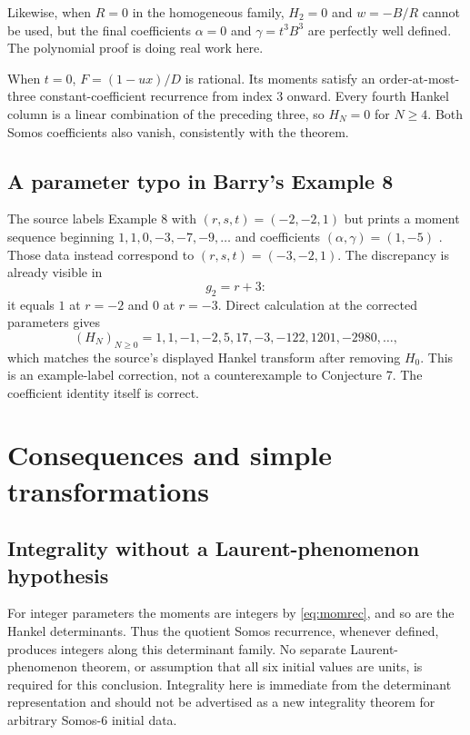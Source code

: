 \documentclass[11pt,a4paper]{article}
\numberwithin{equation}{section}
\theoremstyle{definition}
\begin{document}
Likewise, when $R=0$ in the homogeneous family, $H_2=0$ and $w=-B/R$ cannot
be used, but the final coefficients $\alpha=0$ and $\gamma=t^3B^3$ are
perfectly well defined. The polynomial proof is doing real work here.

When $t=0$, $F=(1-ux)/D$ is rational. Its moments satisfy an order-at-most-three
constant-coefficient recurrence from index $3$ onward. Every fourth Hankel
column is a linear combination of the preceding three, so $H_N=0$ for
$N\geq4$. Both Somos coefficients also vanish, consistently with the theorem.

\subsection{A parameter typo in Barry's Example 8}
The source labels Example 8 with $(r,s,t)=(-2,-2,1)$ but prints a moment
sequence beginning $1,1,0,-3,-7,-9,\ldots$ and coefficients
$(\alpha,\gamma)=(1,-5)$ \cite[p.~7]{Barry2022}. Those data instead correspond
to $(r,s,t)=(-3,-2,1)$. The discrepancy is already visible in
\[
 g_2=r+3:
\]
it equals $1$ at $r=-2$ and $0$ at $r=-3$. Direct calculation at the corrected
parameters gives
\[
 (H_N)_{N\geq0}=1,1,-1,-2,5,17,-3,-122,1201,-2980,\ldots,
\]
which matches the source's displayed Hankel transform after removing $H_0$.
This is an example-label correction, not a counterexample to Conjecture 7.
The coefficient identity itself is correct.

\section{Consequences and simple transformations}

\subsection{Integrality without a Laurent-phenomenon hypothesis}
For integer parameters the moments are integers by \eqref{eq:momrec}, and
so are the Hankel determinants. Thus the quotient Somos recurrence, whenever
defined, produces integers along this determinant family. No separate
Laurent-phenomenon theorem, or assumption that all six initial values are
units, is required for this conclusion. Integrality here is immediate from
the determinant representation and should not be advertised as a new
integrality theorem for arbitrary Somos-6 initial data.
\end{document}
